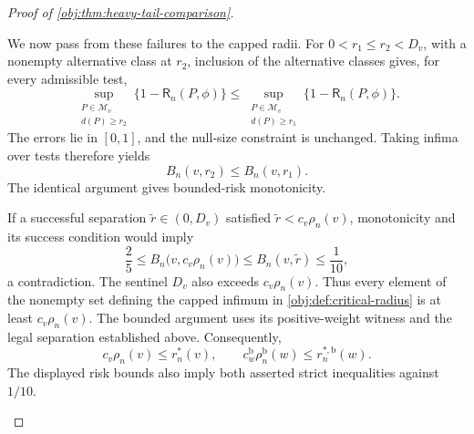 \begin{proof}[Proof of \cref{obj:thm:heavy-tail-comparison}]
\begin{enumerate}
We now pass from these failures to the capped radii. For
\(0<r_1\le r_2<D_v\), with a nonempty alternative class at \(r_2\), inclusion of the alternative classes gives, for every admissible test,
\[
\sup_{\substack{P\in\mathcal M_v\\ d(P)\ge r_2}}
 \{1-\mathsf R_n(P,\phi)\}
\le
\sup_{\substack{P\in\mathcal M_v\\ d(P)\ge r_1}}
 \{1-\mathsf R_n(P,\phi)\}.
\]
The errors lie in \([0,1]\), and the null-size constraint is unchanged. Taking infima over tests therefore yields
\[
B_n(v,r_2)\le B_n(v,r_1).
\]
The identical argument gives bounded-risk monotonicity.

If a successful separation \(\widetilde r\in(0,D_v)\) satisfied
\(\widetilde r<c_v\rho_n(v)\), monotonicity and its success condition would imply
\[
\frac25
\le B_n\bigl(v,c_v\rho_n(v)\bigr)
\le B_n(v,\widetilde r)
\le\frac1{10},
\]
a contradiction. The sentinel \(D_v\) also exceeds \(c_v\rho_n(v)\). Thus every element of the nonempty set defining the capped infimum in \cref{obj:def:critical-radius} is at least \(c_v\rho_n(v)\). The bounded argument uses its positive-weight witness and the legal separation established above. Consequently,
\[
c_v\rho_n(v)\le r_n^*(v),
\qquad
c_w^{\mathrm b}\rho_n^{\mathrm b}(w)
\le r_n^{*,\mathrm b}(w).
\]
The displayed risk bounds also imply both asserted strict inequalities against \(1/10\).


\end{enumerate}
\end{proof}
